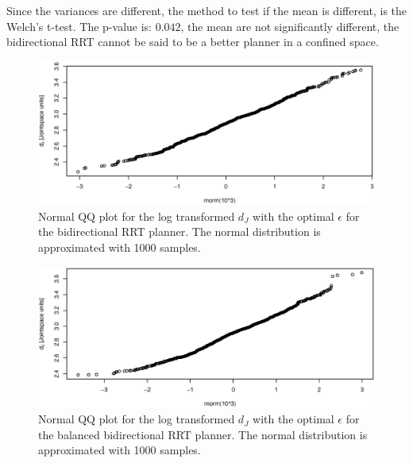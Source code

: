 Since the variances are different, the method to test if the mean is different, is the Welch's t-test.
The p-value is: \(0.042\), the mean are not significantly different, the bidirectional RRT cannot be said to be a better planner in a confined space.


\begin{figure}[H]
 \centering
 \includegraphics[width=\figsize]{graphics/qq_tran_op_bi}
 \caption{Normal QQ plot for the log transformed \(d_J\) with the optimal \(\epsilon\) for the bidirectional RRT planner. The normal distribution is approximated with 1000 samples.}
 \label{fig:bidir_log_qq}
\end{figure}

\begin{figure}[H]
 \centering
 \includegraphics[width=\figsize]{graphics/qq_tran_op_ba}
 \caption{Normal QQ plot for the log transformed \(d_J\) with the optimal \(\epsilon\) for the balanced bidirectional RRT planner. The normal distribution is approximated with 1000 samples.}
 \label{fig:balanced_log_qq}
\end{figure}

